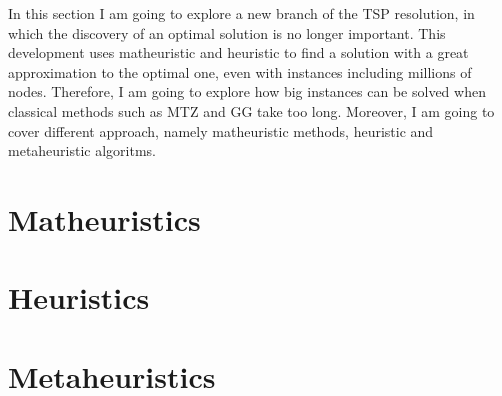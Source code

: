 In this section I am going to explore a new branch of the TSP resolution, in which the discovery of an optimal solution is no longer important. This development uses  matheuristic and heuristic to find a solution with a great approximation to the optimal one, even with instances including millions of nodes. Therefore, I am going to explore how big instances can be solved when classical methods such as MTZ and GG take too long. Moreover, I am going to cover different approach, namely matheuristic methods, heuristic and metaheuristic algoritms.


\section{Matheuristics}


\section{Heuristics}


\section{Metaheuristics}
\label{chapter:metaheuristics}

